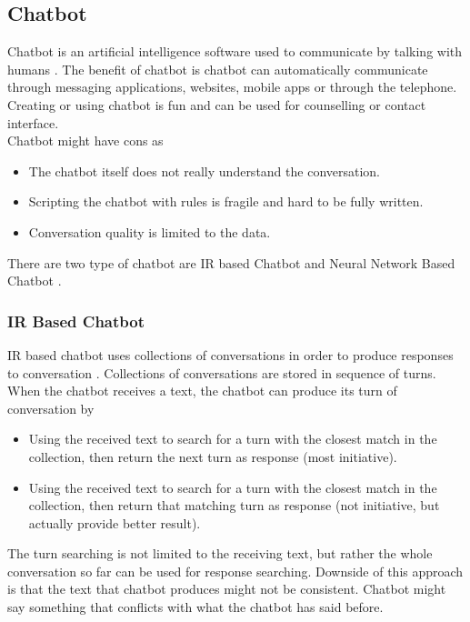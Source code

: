 \documentclass[12pt,oneside,openright,a4paper]{cpe-english-project}
\begin{document}
\subsection{Chatbot}
Chatbot is an artificial intelligence software used to communicate by talking with humans \cite{what_is_chatbot}.
The benefit of chatbot is chatbot can automatically communicate through messaging applications, websites, mobile apps
or through the telephone. Creating or using chatbot is fun and can be used for counselling or contact interface.\\
Chatbot might have cons as
\begin{itemize}
  \item The chatbot itself does not really understand the conversation.
  \item Scripting the chatbot with rules is fragile and hard to be fully written.
  \item Conversation quality is limited to the data.
\end{itemize}
There are two type of chatbot are IR based Chatbot and Neural Network Based Chatbot \cite{what_is_chatbot,five_types_of_chatbot}.

\subsubsection{IR Based Chatbot}
IR based chatbot uses collections of conversations in order to produce responses to conversation \cite{five_types_of_chatbot,rule_based_vs_nlp}.
Collections of conversations are stored in sequence of turns. When the chatbot receives a text,
the chatbot can produce its turn of conversation by
\begin{itemize}
  \item Using the received text to search for a turn with the closest match in the collection,
  then return the next turn as response (most initiative).
  \item Using the received text to search for a turn with the closest match in the collection,
  then return that matching turn as response (not initiative, but actually provide better result).
\end{itemize}
The turn searching is not limited to the receiving text, but rather the whole conversation so far
can be used for response searching. Downside of this approach is that the text that chatbot produces
might not be consistent. Chatbot might say something that conflicts with what the chatbot has said
before.
\end{document}
